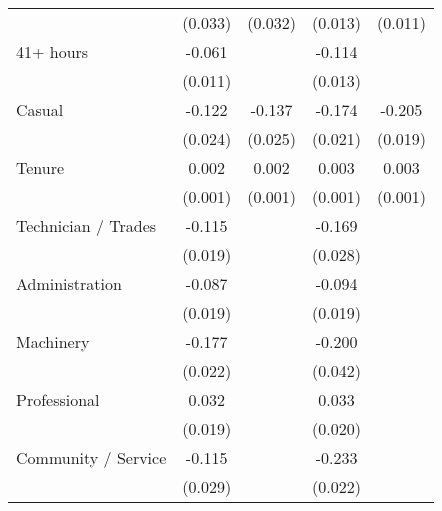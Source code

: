 {\begin{tabular}{l*{4}{c}}
                    &     (0.033)         &     (0.032)         &     (0.013)         &     (0.011)         \\
[1em]
41+ hours           &      -0.061\sym{***}&                     &      -0.114\sym{***}&                     \\
                    &     (0.011)         &                     &     (0.013)         &                     \\
[1em]
Casual              &      -0.122\sym{***}&      -0.137\sym{***}&      -0.174\sym{***}&      -0.205\sym{***}\\
                    &     (0.024)         &     (0.025)         &     (0.021)         &     (0.019)         \\
[1em]
Tenure              &       0.002\sym{*}  &       0.002\sym{*}  &       0.003\sym{***}&       0.003\sym{***}\\
                    &     (0.001)         &     (0.001)         &     (0.001)         &     (0.001)         \\
[1em]
Technician / Trades &      -0.115\sym{***}&                     &      -0.169\sym{***}&                     \\
                    &     (0.019)         &                     &     (0.028)         &                     \\
[1em]
Administration      &      -0.087\sym{***}&                     &      -0.094\sym{***}&                     \\
                    &     (0.019)         &                     &     (0.019)         &                     \\
[1em]
Machinery           &      -0.177\sym{***}&                     &      -0.200\sym{***}&                     \\
                    &     (0.022)         &                     &     (0.042)         &                     \\
[1em]
Professional        &       0.032         &                     &       0.033         &                     \\
                    &     (0.019)         &                     &     (0.020)         &                     \\
[1em]
Community / Service &      -0.115\sym{***}&                     &      -0.233\sym{***}&                     \\
                    &     (0.029)         &                     &     (0.022)         &                     \\

\end{tabular}}
